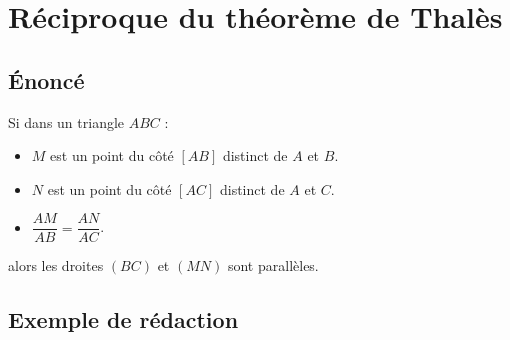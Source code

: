 \section{Réciproque du théorème de Thalès}
    \subsection{Énoncé}
        \begin{theoreme}[\admis]
            Si dans un triangle $ABC$ :
            \begin{itemize}
                \item $M$ est un point du côté $[AB]$ distinct de $A$ et $B$.
                \item $N$ est un point du côté $[AC]$ distinct de $A$ et $C$.
                \item $\dfrac{AM}{AB} = \dfrac{AN}{AC}$.       
            \end{itemize}
            \medskip
            alors les droites $(BC)$ et $(MN)$ sont parallèles.
        \end{theoreme}

    \subsection{Exemple de rédaction}

